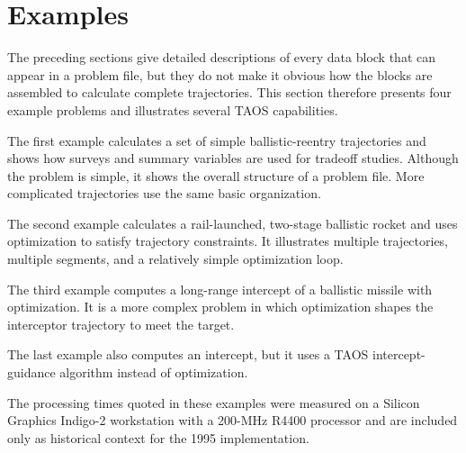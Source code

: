 \section{Examples}\label{sec:problem-examples}

The preceding sections give detailed descriptions of every data block that can appear
in a problem file, but they do not make it obvious how the blocks are assembled to
calculate complete trajectories. This section therefore presents four example
problems and illustrates several TAOS capabilities.

The first example calculates a set of simple ballistic-reentry trajectories and shows
how surveys and summary variables are used for tradeoff studies. Although the
problem is simple, it shows the overall structure of a problem file. More complicated
trajectories use the same basic organization.

The second example calculates a rail-launched, two-stage ballistic rocket and uses
optimization to satisfy trajectory constraints. It illustrates multiple trajectories,
multiple segments, and a relatively simple optimization loop.

The third example computes a long-range intercept of a ballistic missile with
optimization. It is a more complex problem in which optimization shapes the
interceptor trajectory to meet the target.

The last example also computes an intercept, but it uses a TAOS intercept-guidance
algorithm instead of optimization.

The processing times quoted in these examples were measured on a Silicon Graphics
Indigo-2 workstation with a 200-MHz R4400 processor and are included only as
historical context for the 1995 implementation.

